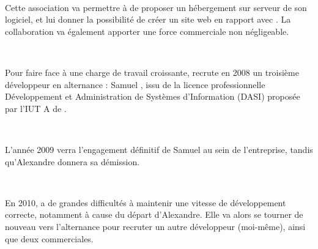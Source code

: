~

Cette association va permettre à \solulog{} de proposer un hébergement sur serveur de son logiciel, et lui donner la possibilité de créer un site web en rapport avec \integrale. La collaboration va également apporter une force commerciale non négligeable.

~

Pour faire face à une charge de travail croissante, \solulog{} recrute en 2008 un troisième développeur en alternance : Samuel , issu de la licence professionnelle Développement et Administration de Systèmes d'Information (DASI) proposée par l'IUT A de .

~

L'année 2009 verra l'engagement définitif de Samuel au sein de l'entreprise, tandis qu'Alexandre donnera sa démission.

~

En 2010, \solulog{} a de grandes difficultés à maintenir une vitesse de développement correcte, notamment à cause du départ d'Alexandre. Elle va alors se tourner de nouveau vers l'alternance pour recruter un autre développeur (moi-même), ainsi que deux commerciales.